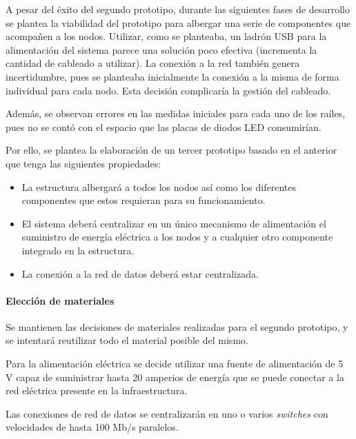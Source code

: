 A pesar del éxito del segundo prototipo, durante las siguientes fases de desarrollo se plantea la viabilidad del prototipo para albergar una serie de componentes que acompañen a los nodos. Utilizar, como se planteaba, un ladrón USB %
para la alimentación del sistema parece una solución poco efectiva (incrementa la cantidad de cableado a utilizar). La conexión a la red también genera incertidumbre, pues se planteaba inicialmente la conexión a la misma de forma individual para cada nodo. Esta decisión complicaría la gestión del cableado.

Además, se observan errores en las medidas iniciales para cada uno de los raíles, pues no se contó con el espacio que las placas de diodos LED consumirían.

Por ello, se plantea la elaboración de un tercer prototipo basado en el anterior que tenga las siguientes propiedades:

\begin{itemize}

\item La estructura albergará a todos los nodos así como los diferentes componentes que estos requieran para su funcionamiento.

\item El sistema deberá centralizar en un único mecanismo de alimentación el suministro de energía eléctrica a los nodos y a cualquier otro componente integrado en la estructura.

\item La conexión a la red de datos deberá estar centralizada.

\end{itemize}

\paragraph{Elección de materiales\\}

Se mantienen las decisiones de materiales realizadas para el segundo prototipo, y se intentará reutilizar todo el material posible del mismo.

Para la alimentación eléctrica se decide utilizar una fuente de alimentación de 5 V capaz de suministrar hasta 20 amperios de energía que se puede conectar a la red eléctrica presente en la infraestructura.

Las conexiones de red de datos se centralizarán en uno o varios \textit{switches} con velocidades de hasta 100 Mb/s paralelos.

